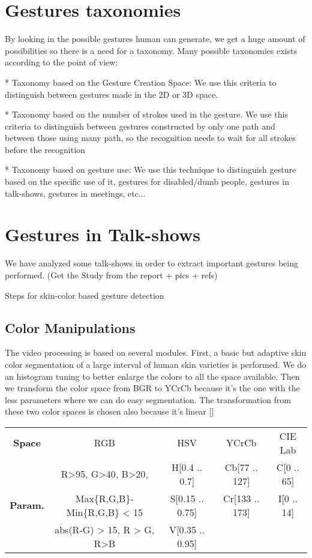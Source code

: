 \documentclass{llncs}
\begin{document}
\section{Gestures taxonomies}
By looking in the possible gestures human can generate, we get a huge amount of possibilities so there is a need for a taxonomy. Many possible taxonomies exists according to the point of view:

* Taxonomy based on the Gesture Creation Space:
We use this criteria to distinguish between gestures made in the 2D or 3D space.

* Taxonomy based on the number of strokes used in the gesture.
We use this criteria to distinguish between gestures constructed by only one path and between those using many path, so the recognition needs to wait for all strokes before the recognition

* Taxonomy based on gesture use:
We use this technique to distinguish gesture based on the specific use of it, gestures for disabled/dumb people, gestures in talk-shows, gestures in meetings, etc...

\section{Gestures in Talk-shows}
We have analyzed some talk-shows in order to extract important gestures being performed.
(Get the Study from the report + pics + refs)

Steps for skin-color based gesture detection

\subsection{Color Manipulations}
The video processing is based on several modules. First, a basic but adaptive skin color segmentation of a large interval of human skin varieties is performed. 
We do an histogram tuning to better enlarge the colors to all the space available.
Then we transform the color space from BGR to YCrCb because it’s the one with the less parameters where we can do easy segmentation. The transformation from these two color spaces is chosen also because it’s linear []

\begin{center}
\begin{tabular}{c|c|c|c|c}
\textbf{Space} & RGB & HSV & YCrCb & CIE Lab\\
  & R>95, G>40, B>20, & H[0.4 .. 0.7] & Cb[77 .. 127] & C[0 .. 65] \\
\textbf{Param.} & Max\{R,G,B\}-Min\{R,G,B\} < 15 & S[0.15 .. 0.75] & Cr[133 .. 173] & I[0 .. 14] \\
  & abs(R-G) > 15, R > G, R>B & V[0.35 .. 0.95] & &
\end{tabular}
\end{center}
\end{document}
